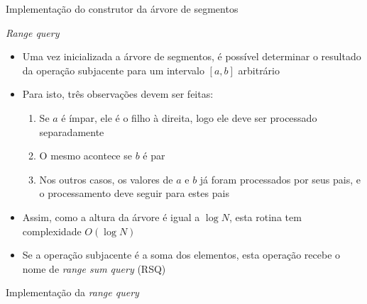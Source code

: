 

\begin{frame}[fragile]{Implementação do construtor da árvore de segmentos}
\end{frame}

\begin{frame}[fragile]{\it Range query}

    \begin{itemize}
        \item Uma vez inicializada a árvore de segmentos, é possível determinar o resultado
            da operação subjacente para um intervalo $[a, b]$ arbitrário

        \item Para isto, três observações devem ser feitas:
            \begin{enumerate}
                \item Se $a$ é ímpar, ele é o filho à direita, logo ele deve ser processado
                    separadamente

                \item O mesmo acontece se $b$ é par

                \item Nos outros casos, os valores de $a$ e $b$ já foram processados por seus
                    pais, e o processamento deve seguir para estes pais
            \end{enumerate}

        \item Assim, como a altura da árvore é igual a $\log N$, esta rotina tem complexidade
            $O(\log N)$

        \item Se a operação subjacente é a soma dos elementos, esta operação recebe o nome de
            \textit{range sum query} (RSQ)
    \end{itemize}

\end{frame}



\begin{frame}[fragile]{Implementação da {\it range query}}
\end{frame}

